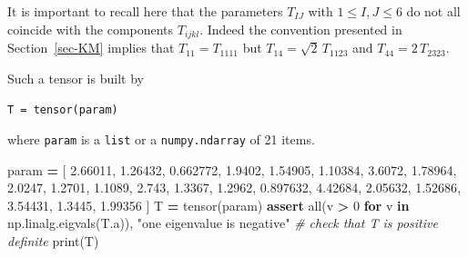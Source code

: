 \documentclass[
  a4paper,
  numbers=noendperiod,
  DIV=12]{scrreprt}
\newenvironment{Shaded}{\begin{snugshade}}{\end{snugshade}}
\newcommand{\BuiltInTok}[1]{#1}
\newcommand{\CommentTok}[1]{\textcolor[rgb]{0.56,0.35,0.01}{\textit{#1}}}
\newcommand{\ControlFlowTok}[1]{\textcolor[rgb]{0.13,0.29,0.53}{\textbf{#1}}}
\newcommand{\DecValTok}[1]{\textcolor[rgb]{0.00,0.00,0.81}{#1}}
\newcommand{\FloatTok}[1]{\textcolor[rgb]{0.00,0.00,0.81}{#1}}
\newcommand{\KeywordTok}[1]{\textcolor[rgb]{0.13,0.29,0.53}{\textbf{#1}}}
\newcommand{\NormalTok}[1]{#1}
\newcommand{\OperatorTok}[1]{\textcolor[rgb]{0.81,0.36,0.00}{\textbf{#1}}}
\newcommand{\StringTok}[1]{\textcolor[rgb]{0.31,0.60,0.02}{#1}}
\begin{document}
\begin{tcolorbox}[enhanced jigsaw, title=\textcolor{quarto-callout-warning-color}{\faExclamationTriangle}\hspace{0.5em}{Warning}, left=2mm, titlerule=0mm, colback=white, breakable, colframe=quarto-callout-warning-color-frame, bottomtitle=1mm, toptitle=1mm, rightrule=.15mm, bottomrule=.15mm, coltitle=black, opacitybacktitle=0.6, arc=.35mm, colbacktitle=quarto-callout-warning-color!10!white, leftrule=.75mm, opacityback=0, toprule=.15mm]

It is important to recall here that the parameters \(T_{IJ}\) with
\(1\leq I,J\leq 6\) do not all coincide with the components
\(T_{ijkl}\). Indeed the convention presented in Section~\ref{sec-KM}
implies that \(T_{11}=T_{1111}\) but \(T_{14}=\sqrt{2}\,T_{1123}\) and
\(T_{44}=2\,T_{2323}\).

\end{tcolorbox}

Such a tensor is built by

\texttt{T\ =\ tensor(param)}

where \texttt{param} is a \texttt{list} or a \texttt{numpy.ndarray} of
21 items.

\begin{Shaded}
\begin{Highlighting}[]
\NormalTok{param }\OperatorTok{=}\NormalTok{ [ }\FloatTok{2.66011}\NormalTok{, }\FloatTok{1.26432}\NormalTok{, }\FloatTok{0.662772}\NormalTok{, }\FloatTok{1.9402}\NormalTok{, }\FloatTok{1.54905}\NormalTok{, }\FloatTok{1.10384}\NormalTok{, }\FloatTok{3.6072}\NormalTok{, }\FloatTok{1.78964}\NormalTok{, }\FloatTok{2.0247}\NormalTok{, }\FloatTok{1.2701}\NormalTok{, }\FloatTok{1.1089}\NormalTok{, }\FloatTok{2.743}\NormalTok{, }\FloatTok{1.3367}\NormalTok{, }\FloatTok{1.2962}\NormalTok{, }\FloatTok{0.897632}\NormalTok{, }\FloatTok{4.42684}\NormalTok{, }\FloatTok{2.05632}\NormalTok{, }\FloatTok{1.52686}\NormalTok{, }\FloatTok{3.54431}\NormalTok{, }\FloatTok{1.3445}\NormalTok{, }\FloatTok{1.99356}\NormalTok{ ]}
\NormalTok{T }\OperatorTok{=}\NormalTok{ tensor(param)}
\ControlFlowTok{assert} \BuiltInTok{all}\NormalTok{(v }\OperatorTok{\textgreater{}} \DecValTok{0} \ControlFlowTok{for}\NormalTok{ v }\KeywordTok{in}\NormalTok{ np.linalg.eigvals(T.a)), }\StringTok{"one eigenvalue is negative"} \CommentTok{\# check that T is positive definite}
\BuiltInTok{print}\NormalTok{(T)}
\end{Highlighting}
\end{Shaded}
\end{document}
